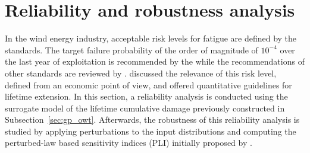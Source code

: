 \section{Reliability and robustness analysis}
In the wind energy industry, acceptable risk levels for fatigue are defined by the standards. 
The target failure probability of the order of magnitude of $10^{-4}$ over the last year of exploitation is recommended by the \citet{iec_2019} while the recommendations of other standards are reviewed by \citet{wang_2022_owt_reliability_review}. 
\citet{nielsen_2021_risk_levels} discussed the relevance of this risk level, defined from an economic point of view, and offered quantitative guidelines for lifetime extension. 
In this section, a reliability analysis is conducted using the surrogate model of the lifetime cumulative damage previously constructed in Subsection~\ref{sec:gp_owt}. 
Afterwards, the robustness of this reliability analysis is studied by applying perturbations to the input distributions and computing the perturbed-law based sensitivity indices (PLI) initially proposed by \citet{lemaitre_2015_PLI}. 


